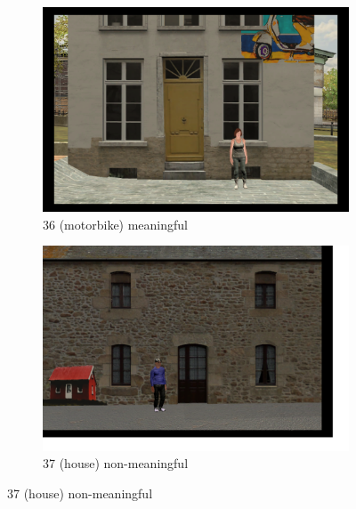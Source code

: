 \begin{figure}[!htb]
	\begin{subfigure}[b]{0.48\linewidth}
		\includegraphics[width=\linewidth]{figures/starting_locations_appx/36_R(motorbike)_A.PNG}
		\caption{36 (motorbike) meaningful}
		\label{fig:36_R(motorbike)_A}
	\end{subfigure}
	\begin{subfigure}[b]{0.48\linewidth}
		\includegraphics[width=\linewidth]{figures/starting_locations_appx/37_R(house)_A.PNG}
		\caption{37 (house) non-meaningful}
		\label{fig:37_R(house)_A}
	\end{subfigure}
	

\end{figure}
